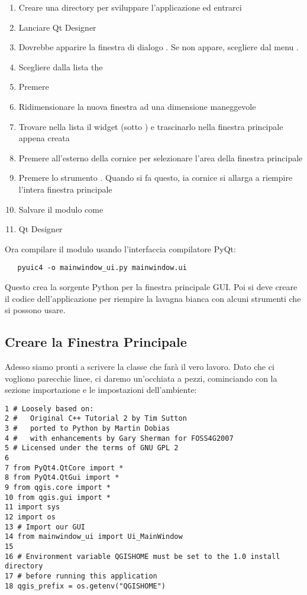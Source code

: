 \begin{enumerate}
\item Creare una directory per sviluppare l'applicazione ed entrarci
\item Lanciare Qt Designer
\item Dovrebbe apparire la finestra di dialogo . Se non appare, scegliere
 dal menu .
\item Scegliere  dalla lista 
the  
\item Premere  
\item Ridimensionare la nuova finestra ad una dimensione maneggevole
\item Trovare nella lista il widget  
(sotto ) e trascinarlo nella finestra principale appena creata
\item Premere all'esterno della cornice per selezionare l'area della finestra principale 
\item Premere lo strumento . Quando si fa questo, ia cornice si allarga a riempire l'intera finestra principale
\item Salvare il modulo come  
\item {} Qt Designer
\end{enumerate} 

Ora compilare il modulo usando l'interfaccia compilatore PyQt:

\begin{verbatim}
   pyuic4 -o mainwindow_ui.py mainwindow.ui
\end{verbatim}

Questo crea la sorgente Python per la finestra principale GUI. Poi si deve creare il codice dell'applicazione per riempire la lavagna bianca con alcuni strumenti che si possono usare.

\subsection{Creare la Finestra Principale}

Adesso siamo pronti a scrivere la classe  che farà il vero lavoro.
Dato che ci vogliono parecchie linee, ci daremo un'occhiata a pezzi, cominciando con la sezione importazione e le impostazioni dell'ambiente:

\begin{verbatim}
1 # Loosely based on:
2 #   Original C++ Tutorial 2 by Tim Sutton
3 #   ported to Python by Martin Dobias
4 #   with enhancements by Gary Sherman for FOSS4G2007
5 # Licensed under the terms of GNU GPL 2
6
7 from PyQt4.QtCore import *
8 from PyQt4.QtGui import *
9 from qgis.core import *
10 from qgis.gui import *
11 import sys
12 import os
13 # Import our GUI
14 from mainwindow_ui import Ui_MainWindow
15 
16 # Environment variable QGISHOME must be set to the 1.0 install directory
17 # before running this application
18 qgis_prefix = os.getenv("QGISHOME")
\end{verbatim}

